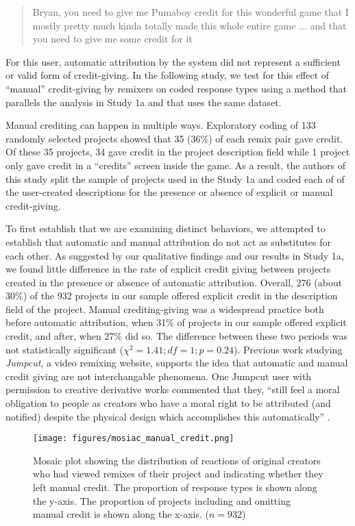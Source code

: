 \begin{quote}
  Bryan, you need to give me Pumaboy credit for this wonderful game
  that I mostly pretty much kinda totally made this whole entire game
  ... and that you need to give me some credit for it
\end{quote}

For this user, automatic attribution by the system did not represent a
sufficient or valid form of credit-giving. In the following study, we
test for this effect of ``manual'' credit-giving by remixers on coded
response types using a method that parallels the analysis in Study 1a
and that uses the same dataset.

Manual crediting can happen in multiple ways.  Exploratory coding of
133 randomly selected projects showed that 35 (36\%) of each remix pair gave
credit.  Of these 35 projects, 34 gave credit in the project
description field while 1 project only gave credit in a ``credits''
screen inside the game. As a result, the authors of this study split
the sample of projects used in the Study 1a and coded each of of the
user-created descriptions for the presence or absence of explicit or
manual credit-giving.

To first establish that we are examining distinct behaviors, we
attempted to establish that automatic and manual attribution do not
act as substitutes for each other. As suggested by our qualitative
findings and our results in Study 1a, we found little difference in
the rate of explicit credit giving between projects created in the
presence or absence of automatic attribution. Overall, 276 (about
30\%) of the 932 projects in our sample offered explicit credit in the
description field of the project. Manual crediting-giving was a
widespread practice both before automatic attribution, when 31\% of
projects in our sample offered explicit credit, and after, when 27\%
did so.  The difference between these two periods was not
statistically significant ($\chi^2=1.41; df=1; p=0.24$). Previous work
studying \emph{Jumpcut}, a video remixing website, supports the idea
that automatic and manual credit giving are not interchangable
phenomena.  One Jumpcut user with permission to creative derivative
works commented that they, ``still feel a moral obligation to people
as creators who have a moral right to be attributed (and notified)
despite the physical design which accomplishes this automatically''
\cite{diakopoulos_evolution_2007}.

\begin{figure}
\begin{center}
\texttt{[image: figures/mosiac\_manual\_credit.png]}
\caption{Mosaic plot showing the distribution of reactions of original
  creators who had viewed remixes of their project and indicating
  whether they left manual credit. The proportion of response types is
  shown along the y-axis. The proportion of projects including and
  omitting manual credit is shown along the x-axis. ($n=932$)}
\label{fig:moscredit}
\end{center}
\end{figure}

